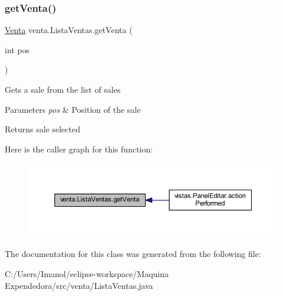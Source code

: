 \subsubsection{\texorpdfstring{get\+Venta()}{getVenta()}}
{\footnotesize\ttfamily \mbox{\hyperlink{classventa_1_1_venta}{Venta}} venta.\+Lista\+Ventas.\+get\+Venta (\begin{DoxyParamCaption}\item[{int}]{pos }\end{DoxyParamCaption})}

Gets a sale from the list of sales 
\begin{DoxyParams}{Parameters}
{\em pos} & Position of the sale \\
\hline
\end{DoxyParams}
\begin{DoxyReturn}{Returns}
sale selected 
\end{DoxyReturn}
Here is the caller graph for this function\+:
\nopagebreak
\begin{figure}[H]
\begin{center}
\leavevmode
\includegraphics[width=350pt]{classventa_1_1_lista_ventas_ae3dd8941eee7b0e14309add4764d3d1a_icgraph}
\end{center}
\end{figure}


The documentation for this class was generated from the following file\+:\begin{DoxyCompactItemize}
\item 
C\+:/\+Users/\+Imanol/eclipse-\/workspace/\+Maquina Expendedora/src/venta/Lista\+Ventas.\+java\end{DoxyCompactItemize}
